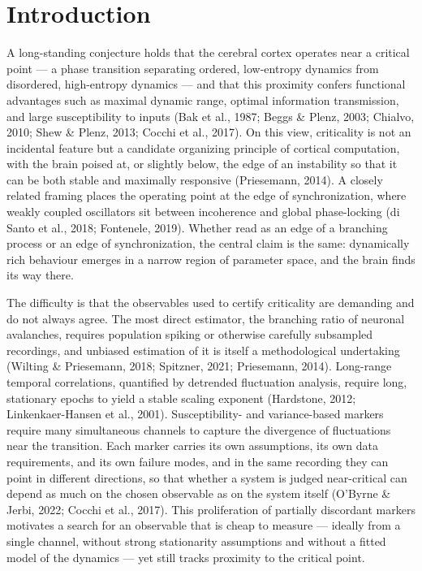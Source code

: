 \documentclass[11pt]{article}
\begin{document}
\section{Introduction}
A long-standing conjecture holds that the cerebral cortex operates near a critical point --- a phase transition separating ordered, low-entropy dynamics from disordered, high-entropy dynamics --- and that this proximity confers functional advantages such as maximal dynamic range, optimal information transmission, and large susceptibility to inputs (Bak et al., 1987; Beggs \& Plenz, 2003; Chialvo, 2010; Shew \& Plenz, 2013; Cocchi et al., 2017). On this view, criticality is not an incidental feature but a candidate organizing principle of cortical computation, with the brain poised at, or slightly below, the edge of an instability so that it can be both stable and maximally responsive (Priesemann, 2014). A closely related framing places the operating point at the edge of synchronization, where weakly coupled oscillators sit between incoherence and global phase-locking (di Santo et al., 2018; Fontenele, 2019). Whether read as an edge of a branching process or an edge of synchronization, the central claim is the same: dynamically rich behaviour emerges in a narrow region of parameter space, and the brain finds its way there.

The difficulty is that the observables used to certify criticality are demanding and do not always agree. The most direct estimator, the branching ratio of neuronal avalanches, requires population spiking or otherwise carefully subsampled recordings, and unbiased estimation of it is itself a methodological undertaking (Wilting \& Priesemann, 2018; Spitzner, 2021; Priesemann, 2014). Long-range temporal correlations, quantified by detrended fluctuation analysis, require long, stationary epochs to yield a stable scaling exponent (Hardstone, 2012; Linkenkaer-Hansen et al., 2001). Susceptibility- and variance-based markers require many simultaneous channels to capture the divergence of fluctuations near the transition. Each marker carries its own assumptions, its own data requirements, and its own failure modes, and in the same recording they can point in different directions, so that whether a system is judged near-critical can depend as much on the chosen observable as on the system itself (O'Byrne \& Jerbi, 2022; Cocchi et al., 2017). This proliferation of partially discordant markers motivates a search for an observable that is cheap to measure --- ideally from a single channel, without strong stationarity assumptions and without a fitted model of the dynamics --- yet still tracks proximity to the critical point.
\end{document}

